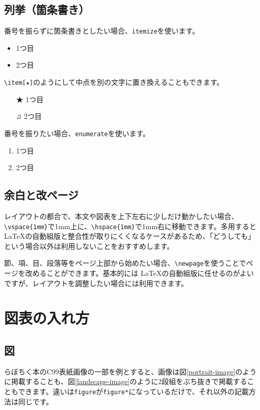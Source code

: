 \subsection{列挙（箇条書き）}
番号を振らずに箇条書きとしたい場合、\verb=itemize=を使います。

\begin{itemize}
    \item 1つ目
    \item 2つ目
\end{itemize}

\verb=\item[★]=のようにして中点を別の文字に置き換えることもできます。

\begin{itemize}
    \item[★ ] 1つ目
    \item[♫ ] 2つ目
\end{itemize}

番号を振りたい場合、\verb=enumerate=を使います。

\begin{enumerate}
    \item 1つ目
    \item 2つ目
\end{enumerate}

\subsection{余白と改ページ}
レイアウトの都合で、本文や図表を上下左右に少しだけ動かしたい場合、\verb=\vspace{1mm}=で1mm上に、\verb=\hspace{1mm}=で1mm右に移動できます。多用すると \LaTeX の自動組版と整合性が取りにくくなるケースがあるため、「どうしても」という場合以外は利用しないことをおすすめします。

節、項、目、段落等をページ上部から始めたい場合、\verb=\newpage=を使うことでページを改めることができます。基本的には \LaTeX の自動組版に任せるのがよいですが、レイアウトを調整したい場合には利用できます。

\section{図表の入れ方}
\subsection{図}
らぼちく本のC99表紙画像の一部を例とすると、画像は図\ref{portrait-image}のように掲載することも、図\ref{landscape-image}のように2段組をぶち抜きで掲載することもできます。違いは\verb=figure=が\verb=figure*=になっているだけで、それ以外の記載方法は同じです。

